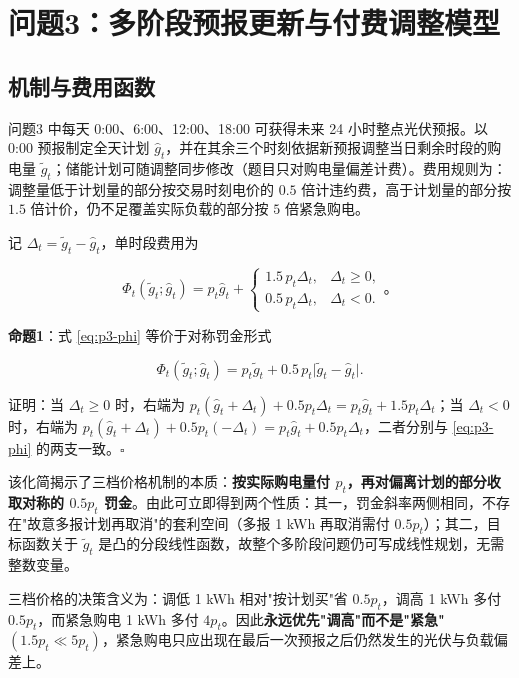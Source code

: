 \section{问题3：多阶段预报更新与付费调整模型}

\subsection{机制与费用函数}

问题3 中每天 0:00、6:00、12:00、18:00 可获得未来 24 小时整点光伏预报。以 0:00 预报制定全天计划 $\hat g_t$，并在其余三个时刻依据新预报调整当日剩余时段的购电量 $\tilde g_t$；储能计划可随调整同步修改（题目只对购电量偏差计费）。费用规则为：调整量低于计划量的部分按交易时刻电价的 $0.5$ 倍计违约费，高于计划量的部分按 $1.5$ 倍计价，仍不足覆盖实际负载的部分按 $5$ 倍紧急购电。

记 $\Delta_t=\tilde g_t-\hat g_t$，单时段费用为

\begin{equation}
  \Phi_t(\tilde g_t;\hat g_t)=p_t\hat g_t+
  \begin{cases}
    1.5\,p_t\Delta_t, & \Delta_t\ge0,\\[2pt]
    0.5\,p_t\Delta_t, & \Delta_t<0 .
  \end{cases}\text{。}
  \label{eq:p3-phi}
\end{equation}

\textbf{命题1}：式 \eqref{eq:p3-phi} 等价于对称罚金形式

\begin{equation}
  \Phi_t(\tilde g_t;\hat g_t)=p_t\tilde g_t+0.5\,p_t\big|\tilde g_t-\hat g_t\big| .
  \label{eq:p3-sym}
\end{equation}

证明：当 $\Delta_t\ge0$ 时，右端为 $p_t(\hat g_t+\Delta_t)+0.5p_t\Delta_t=p_t\hat g_t+1.5p_t\Delta_t$；当 $\Delta_t<0$ 时，右端为 $p_t(\hat g_t+\Delta_t)+0.5p_t(-\Delta_t)=p_t\hat g_t+0.5p_t\Delta_t$，二者分别与 \cref{eq:p3-phi} 的两支一致。\hfill$\square$

该化简揭示了三档价格机制的本质：\textbf{按实际购电量付 $p_t$，再对偏离计划的部分收取对称的 $0.5p_t$ 罚金}。由此可立即得到两个性质：其一，罚金斜率两侧相同，不存在"故意多报计划再取消"的套利空间（多报 1 \si{kWh} 再取消需付 $0.5p_t$）；其二，目标函数关于 $\tilde g_t$ 是凸的分段线性函数，故整个多阶段问题仍可写成线性规划，无需整数变量。

三档价格的决策含义为：调低 1 \si{kWh} 相对"按计划买"省 $0.5p_t$，调高 1 \si{kWh} 多付 $0.5p_t$，而紧急购电 1 \si{kWh} 多付 $4p_t$。因此\textbf{永远优先"调高"而不是"紧急"}$(1.5p_t\ll5p_t)$，紧急购电只应出现在最后一次预报之后仍然发生的光伏与负载偏差上。

